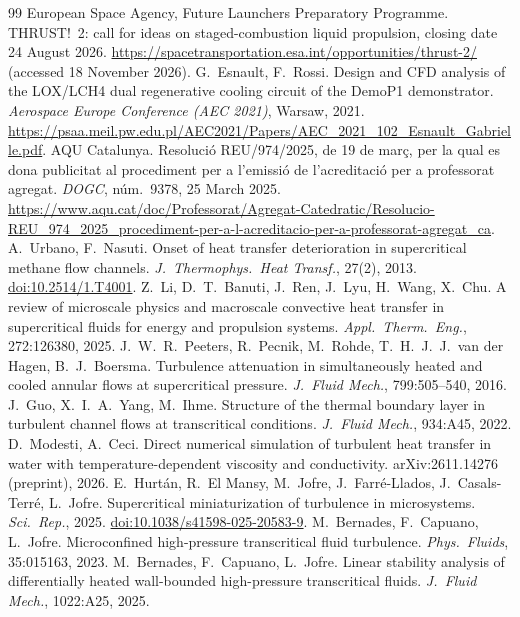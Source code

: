 \documentclass[11pt]{article}
\begin{document}
\begin{thebibliography}{99}
 European Space Agency, Future Launchers Preparatory Programme. THRUST!~2: call for ideas on staged-combustion liquid propulsion, closing date 24 August 2026. \url{https://spacetransportation.esa.int/opportunities/thrust-2/} (accessed 18 November 2026).
 G.\ Esnault, F.\ Rossi. Design and CFD analysis of the LOX/LCH4 dual regenerative cooling circuit of the DemoP1 demonstrator. \emph{Aerospace Europe Conference (AEC 2021)}, Warsaw, 2021. \url{https://psaa.meil.pw.edu.pl/AEC2021/Papers/AEC_2021_102_Esnault_Gabrielle.pdf}.
 AQU Catalunya. Resoluci\'o REU/974/2025, de 19 de mar\c{c}, per la qual es dona publicitat al procediment per a l'emissi\'o de l'acreditaci\'o per a professorat agregat. \emph{DOGC}, n\'um.~9378, 25 March 2025. \url{https://www.aqu.cat/doc/Professorat/Agregat-Catedratic/Resolucio-REU_974_2025_procediment-per-a-l-acreditacio-per-a-professorat-agregat_ca}.
 A.\ Urbano, F.\ Nasuti. Onset of heat transfer deterioration in supercritical methane flow channels. \emph{J.\ Thermophys.\ Heat Transf.}, 27(2), 2013. \href{https://doi.org/10.2514/1.T4001}{doi:10.2514/1.T4001}.
 Z.\ Li, D.\ T.\ Banuti, J.\ Ren, J.\ Lyu, H.\ Wang, X.\ Chu. A review of microscale physics and macroscale convective heat transfer in supercritical fluids for energy and propulsion systems. \emph{Appl.\ Therm.\ Eng.}, 272:126380, 2025.
 J.\ W.\ R.\ Peeters, R.\ Pecnik, M.\ Rohde, T.\ H.\ J.\ J.\ van der Hagen, B.\ J.\ Boersma. Turbulence attenuation in simultaneously heated and cooled annular flows at supercritical pressure. \emph{J.\ Fluid Mech.}, 799:505--540, 2016.
 J.\ Guo, X.\ I.\ A.\ Yang, M.\ Ihme. Structure of the thermal boundary layer in turbulent channel flows at transcritical conditions. \emph{J.\ Fluid Mech.}, 934:A45, 2022.
 D.\ Modesti, A.\ Ceci. Direct numerical simulation of turbulent heat transfer in water with temperature-dependent viscosity and conductivity. arXiv:2611.14276 (preprint), 2026.
 E.\ Hurt\'an, R.\ El Mansy, M.\ Jofre, J.\ Farr\'e-Llados, J.\ Casals-Terr\'e, L.\ Jofre. Supercritical miniaturization of turbulence in microsystems. \emph{Sci.\ Rep.}, 2025. \href{https://doi.org/10.1038/s41598-025-20583-9}{doi:10.1038/s41598-025-20583-9}.
 M.\ Bernades, F.\ Capuano, L.\ Jofre. Microconfined high-pressure transcritical fluid turbulence. \emph{Phys.\ Fluids}, 35:015163, 2023.
 M.\ Bernades, F.\ Capuano, L.\ Jofre. Linear stability analysis of differentially heated wall-bounded high-pressure transcritical fluids. \emph{J.\ Fluid Mech.}, 1022:A25, 2025.

\end{thebibliography}
\end{document}
